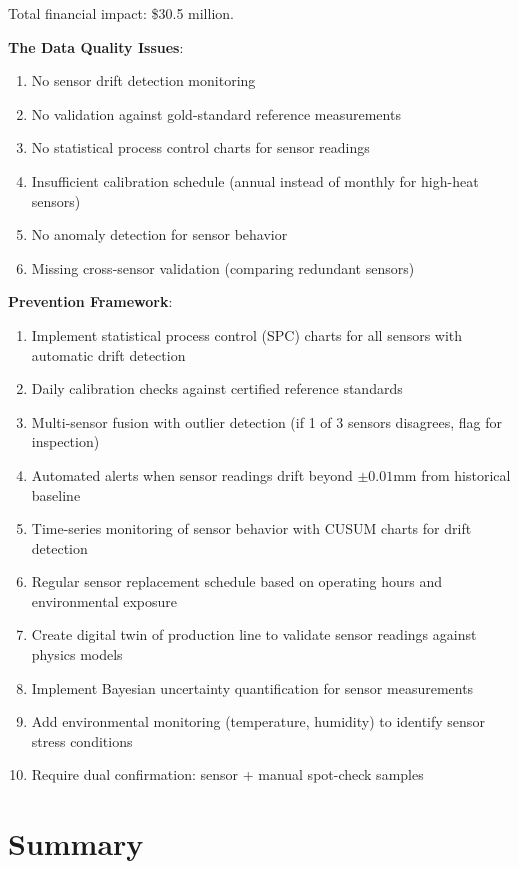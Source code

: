 Total financial impact: \$30.5 million.

\textbf{The Data Quality Issues}:
\begin{enumerate}
    \item No sensor drift detection monitoring
    \item No validation against gold-standard reference measurements
    \item No statistical process control charts for sensor readings
    \item Insufficient calibration schedule (annual instead of monthly for high-heat sensors)
    \item No anomaly detection for sensor behavior
    \item Missing cross-sensor validation (comparing redundant sensors)
\end{enumerate}

\textbf{Prevention Framework}:
\begin{enumerate}
    \item Implement statistical process control (SPC) charts for all sensors with automatic drift detection
    \item Daily calibration checks against certified reference standards
    \item Multi-sensor fusion with outlier detection (if 1 of 3 sensors disagrees, flag for inspection)
    \item Automated alerts when sensor readings drift beyond $\pm 0.01$mm from historical baseline
    \item Time-series monitoring of sensor behavior with CUSUM charts for drift detection
    \item Regular sensor replacement schedule based on operating hours and environmental exposure
    \item Create digital twin of production line to validate sensor readings against physics models
    \item Implement Bayesian uncertainty quantification for sensor measurements
    \item Add environmental monitoring (temperature, humidity) to identify sensor stress conditions
    \item Require dual confirmation: sensor + manual spot-check samples
\end{enumerate}

\section{Summary}

